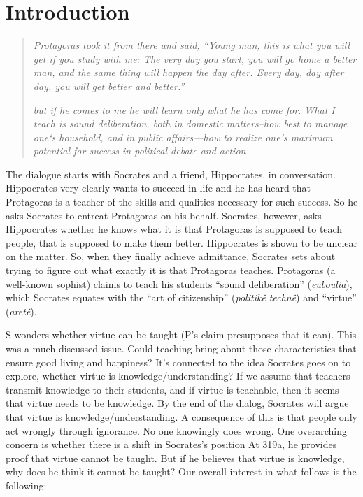 \documentclass[oneside]{article}
\begin{document}
\section*{Introduction}

\begin{quote}
\emph{Protagoras took it from there and said, ``Young man, this is what you will get if you study with me: The very day you start, you will go home a better man, and the same thing will happen the day after. Every day, day after day, you will get better and better.''}

\emph{but if he comes to me he will learn only what he has come for. What I teach is sound deliberation, both in domestic matters--how best to manage one`s household, and in public affairs---how to realize one's maximum potential for success in political debate and action}
\end{quote}

\noindent The dialogue starts with Socrates and a friend, Hippocrates, in conversation. Hippocrates very clearly wants to succeed in life and he has heard that Protagoras is a teacher of the skills and qualities necessary for such success. So he asks Socrates to entreat Protagoras on his behalf. Socrates, however, asks Hippocrates whether he knows what it is that Protagoras is supposed to teach people, that is supposed to make them better. Hippocrates is shown to be unclear on the matter. So, when they finally achieve admittance, Socrates sets about trying to figure out what exactly it is that Protagoras teaches. Protagoras (a well-known sophist) claims to teach his students ``sound deliberation'' (\emph{euboulia}), which Socrates equates with the ``art of citizenship'' (\emph{politik\^{e} techn\^{e}}) and ``virtue'' (\emph{aret\^{e}}). 
\vspace*{2mm}

\noindent S wonders whether virtue can be taught (P's claim presupposes that it can). This was a much discussed issue. Could teaching bring about those characteristics that ensure good living and happiness? It's connected to the idea Socrates goes on to explore, whether virtue is knowledge/understanding? If we assume that teachers transmit knowledge to their students, and if virtue is teachable, then it seems that virtue needs to be knowledge. By the end of the dialog, Socrates will argue that virtue is knowledge/understanding. A consequence of this is that people only act wrongly through ignorance. No one knowingly does wrong. One overarching concern is whether there is a shift in Socrates's position At 319a, he provides proof that virtue cannot be taught. But if he believes that virtue is knowledge, why does he think it cannot be taught? Our overall interest in what follows is the following: 
\end{document}
